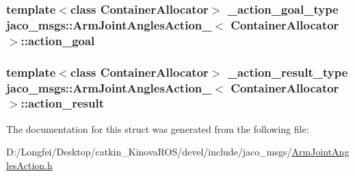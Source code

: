 \subsubsection[{\texorpdfstring{action\+\_\+goal}{action_goal}}]{\setlength{\rightskip}{0pt plus 5cm}template$<$class Container\+Allocator$>$ {\bf \+\_\+action\+\_\+goal\+\_\+type} {\bf jaco\+\_\+msgs\+::\+Arm\+Joint\+Angles\+Action\+\_\+}$<$ Container\+Allocator $>$\+::action\+\_\+goal}\hypertarget{structjaco__msgs_1_1ArmJointAnglesAction___ae94e8854432290ab918b68cccf5fd63e}{}\label{structjaco__msgs_1_1ArmJointAnglesAction___ae94e8854432290ab918b68cccf5fd63e}
\subsubsection[{\texorpdfstring{action\+\_\+result}{action_result}}]{\setlength{\rightskip}{0pt plus 5cm}template$<$class Container\+Allocator$>$ {\bf \+\_\+action\+\_\+result\+\_\+type} {\bf jaco\+\_\+msgs\+::\+Arm\+Joint\+Angles\+Action\+\_\+}$<$ Container\+Allocator $>$\+::action\+\_\+result}\hypertarget{structjaco__msgs_1_1ArmJointAnglesAction___a8c8fe221e785eaf52c1651021d5cf6e9}{}\label{structjaco__msgs_1_1ArmJointAnglesAction___a8c8fe221e785eaf52c1651021d5cf6e9}


The documentation for this struct was generated from the following file\+:\begin{DoxyCompactItemize}
\item 
D\+:/\+Longfei/\+Desktop/catkin\+\_\+\+Kinova\+R\+O\+S/devel/include/jaco\+\_\+msgs/\hyperlink{ArmJointAnglesAction_8h}{Arm\+Joint\+Angles\+Action.\+h}\end{DoxyCompactItemize}
